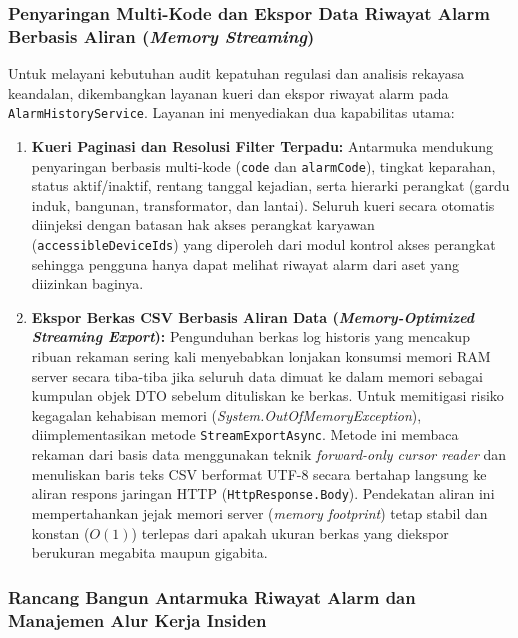 \subsubsection{Penyaringan Multi-Kode dan Ekspor Data Riwayat Alarm Berbasis Aliran (\textit{Memory Streaming})}

Untuk melayani kebutuhan audit kepatuhan regulasi dan analisis rekayasa keandalan, dikembangkan layanan kueri dan ekspor riwayat alarm pada \texttt{AlarmHistoryService}. Layanan ini menyediakan dua kapabilitas utama:

\begin{enumerate}[label=\arabic*., leftmargin=*, itemsep=0pt]
  \item \textbf{Kueri Paginasi dan Resolusi Filter Terpadu:} Antarmuka mendukung penyaringan berbasis multi-kode (\texttt{code} dan \texttt{alarmCode}), tingkat keparahan, status aktif/inaktif, rentang tanggal kejadian, serta hierarki perangkat (gardu induk, bangunan, transformator, dan lantai). Seluruh kueri secara otomatis diinjeksi dengan batasan hak akses perangkat karyawan (\texttt{accessibleDeviceIds}) yang diperoleh dari modul kontrol akses perangkat sehingga pengguna hanya dapat melihat riwayat alarm dari aset yang diizinkan baginya.
  \item \textbf{Ekspor Berkas CSV Berbasis Aliran Data (\textit{Memory-Optimized Streaming Export}):} Pengunduhan berkas log historis yang mencakup ribuan rekaman sering kali menyebabkan lonjakan konsumsi memori RAM server secara tiba-tiba jika seluruh data dimuat ke dalam memori sebagai kumpulan objek DTO sebelum dituliskan ke berkas. Untuk memitigasi risiko kegagalan kehabisan memori (\textit{System.OutOfMemoryException}), diimplementasikan metode \texttt{StreamExportAsync}. Metode ini membaca rekaman dari basis data menggunakan teknik \textit{forward-only cursor reader} dan menuliskan baris teks CSV berformat UTF-8 secara bertahap langsung ke aliran respons jaringan HTTP (\texttt{HttpResponse.Body}). Pendekatan aliran ini mempertahankan jejak memori server (\textit{memory footprint}) tetap stabil dan konstan ($O(1)$) terlepas dari apakah ukuran berkas yang diekspor berukuran megabita maupun gigabita.
\end{enumerate}

\subsubsection{Rancang Bangun Antarmuka Riwayat Alarm dan Manajemen Alur Kerja Insiden}

